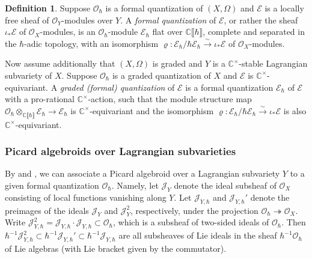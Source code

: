 \documentclass[11pt, a4paper]{amsart}
\newcommand{\C}{\mathbb{C}}
\newcommand{\J}{\mathcal{J}}
\newcommand{\cE}{\mathcal{E}}
\newcommand{\hb}{\hbar}
\newcommand{\series}{\llbracket \hb \rrbracket}
\newcommand{\cm}{\C^\times}
\newcommand{\OO}{\mathcal{O}}
\theoremstyle{definition}
\newtheorem{defi}[Thm]{Definition}
\numberwithin{equation}{section}
\begin{document}
\begin{defi}
	Suppose $\OO_\hb$ is a formal quantization of $(X, \Omega)$ and $\cE$ is a locally free sheaf of $\OO_Y$-modules over $Y$. A {\it formal quantization} of $\cE$, or rather the sheaf $\iota_* \cE$ of $\OO_X$-modules, is an $\OO_\hb$-module $\cE_\hb$ flat over $\C\series$, complete and separated in the $\hb$-adic topology, with an isomorphism $\varrho: \cE_\hb /\hb \cE_\hb \xrightarrow{\sim} \iota_*\cE$ of $\OO_X$-modules.

	Now assume additionally that $(X, \Omega)$ is graded and $Y$ is a $\cm$-stable Lagrangian subvariety of $X$. Suppose $\OO_\hb$ is a graded quantization of $X$ and $\cE$ is $\cm$-equivariant. A {\it graded (formal) quantization} of $\cE$ is a formal quantization $\cE_\hb$ of $\cE$ with a pro-rational $\cm$-action, such that the module structure map $\OO_\hb \otimes_{\C\series} \cE_\hb \to \cE_\hb$ is $\cm$-equivariant and the isomorphism $\varrho: \cE_\hb /\hb \cE_\hb \xrightarrow{\sim} \iota_*\cE$ is also $\cm$-equivariant.
\end{defi}

\subsubsection{Picard algebroids over Lagrangian subvarieties} \label{subsubsec:lag_pic}

By \cite[Section 5.3]{BGKP} and \cite[Section 4.1]{LY}, we can associate a Picard algebroid over a Lagrangian subvariety $Y$ to a given formal quantization $\OO_\hb$. Namely, let $\J_Y$ denote the ideal subsheaf of $\OO_X$ consisting of local functions vanishing along $Y$. Let $\J_{Y,\hb}$ and $\J_{Y,\hb}'$ denote the preimages of the ideals $\J_Y$ and $\J_Y^2$, respectively, under the projection $\OO_\hb \twoheadrightarrow \OO_X$. Write $\J_{Y,\hb}^2 = \J_{Y,\hb} \cdot \J_{Y,\hb} \subset \OO_\hb$, which is a subsheaf of two-sided ideals of $\OO_\hb$. Then $\hb^{-1} \J_{Y,\hb}^2 \subset \hb^{-1}\J_{Y,\hb}' \subset \hb^{-1}\J_{Y,\hb}$ are all subsheaves of Lie ideals in the sheaf $\hb^{-1}\OO_\hb$ of Lie algebras (with Lie bracket given by the commutator). 
\end{document}
